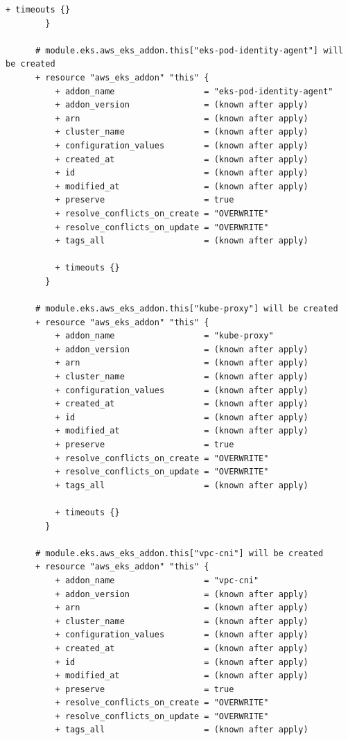 \begin{lstlisting}[caption={terraform plan output for \texttt{cloudkube} provisioning}, breaklines=true, breakatwhitespace=false]
          + timeouts {}
        }
    
      # module.eks.aws_eks_addon.this["eks-pod-identity-agent"] will be created
      + resource "aws_eks_addon" "this" {
          + addon_name                  = "eks-pod-identity-agent"
          + addon_version               = (known after apply)
          + arn                         = (known after apply)
          + cluster_name                = (known after apply)
          + configuration_values        = (known after apply)
          + created_at                  = (known after apply)
          + id                          = (known after apply)
          + modified_at                 = (known after apply)
          + preserve                    = true
          + resolve_conflicts_on_create = "OVERWRITE"
          + resolve_conflicts_on_update = "OVERWRITE"
          + tags_all                    = (known after apply)
    
          + timeouts {}
        }
    
      # module.eks.aws_eks_addon.this["kube-proxy"] will be created
      + resource "aws_eks_addon" "this" {
          + addon_name                  = "kube-proxy"
          + addon_version               = (known after apply)
          + arn                         = (known after apply)
          + cluster_name                = (known after apply)
          + configuration_values        = (known after apply)
          + created_at                  = (known after apply)
          + id                          = (known after apply)
          + modified_at                 = (known after apply)
          + preserve                    = true
          + resolve_conflicts_on_create = "OVERWRITE"
          + resolve_conflicts_on_update = "OVERWRITE"
          + tags_all                    = (known after apply)
    
          + timeouts {}
        }
    
      # module.eks.aws_eks_addon.this["vpc-cni"] will be created
      + resource "aws_eks_addon" "this" {
          + addon_name                  = "vpc-cni"
          + addon_version               = (known after apply)
          + arn                         = (known after apply)
          + cluster_name                = (known after apply)
          + configuration_values        = (known after apply)
          + created_at                  = (known after apply)
          + id                          = (known after apply)
          + modified_at                 = (known after apply)
          + preserve                    = true
          + resolve_conflicts_on_create = "OVERWRITE"
          + resolve_conflicts_on_update = "OVERWRITE"
          + tags_all                    = (known after apply)
    

\end{lstlisting}
